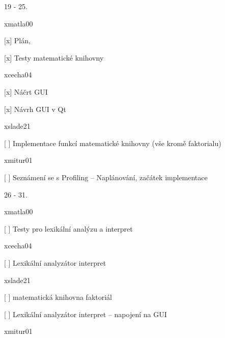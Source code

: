 
\begin{DoxyItemize}
\item 19 -\/ 25.
\begin{DoxyItemize}
\item xmatla00
\begin{DoxyItemize}
\item \mbox{[}x\mbox{]} Plán,
\item \mbox{[}x\mbox{]} Testy matematické knihovny
\end{DoxyItemize}
\item xcecha04
\begin{DoxyItemize}
\item \mbox{[}x\mbox{]} Náčrt G\+UI
\item \mbox{[}x\mbox{]} Návrh G\+UI v Qt
\end{DoxyItemize}
\item xslade21
\begin{DoxyItemize}
\item \mbox{[} \mbox{]} Implementace funkcí matematické knihovny (vše kromě faktorialu)
\end{DoxyItemize}
\item xmitur01
\begin{DoxyItemize}
\item \mbox{[} \mbox{]} Seznámení se s Profiling – Naplánování, začátek implementace
\end{DoxyItemize}
\end{DoxyItemize}
\item 26 -\/ 31.
\begin{DoxyItemize}
\item xmatla00
\begin{DoxyItemize}
\item \mbox{[} \mbox{]} Testy pro lexikální analýzu a interpret
\end{DoxyItemize}
\item xcecha04
\begin{DoxyItemize}
\item \mbox{[} \mbox{]} Lexikální analyzátor interpret
\end{DoxyItemize}
\item xslade21
\begin{DoxyItemize}
\item \mbox{[} \mbox{]} matematická knihovna faktoriál
\item \mbox{[} \mbox{]} Lexikální analyzátor interpret – napojení na G\+UI
\end{DoxyItemize}
\item xmitur01

\end{DoxyItemize}
\end{DoxyItemize}

